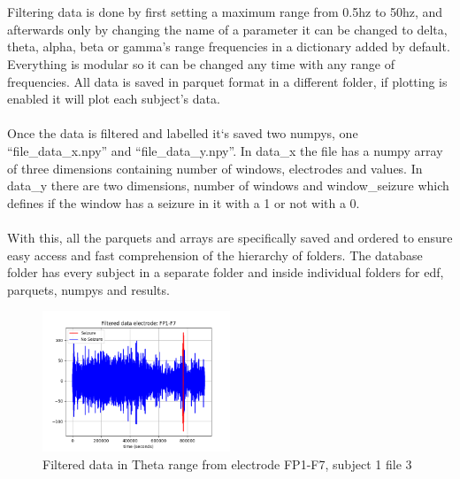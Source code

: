 \\\\
Filtering data is done by first setting a maximum range from 0.5hz to 50hz, and afterwards only by changing the name of a parameter it can be changed to delta, theta, alpha, beta or gamma’s range frequencies in a dictionary added by default. Everything is modular so it can be changed any time with any range of frequencies. All data is saved in parquet format in a different folder, if plotting is enabled it will plot each subject’s data.
\\\\
Once the data is filtered and labelled it`s saved two numpys, one “file\_data\_x.npy” and “file\_data\_y.npy”. In data\_x the file has a numpy array of three dimensions containing number of windows, electrodes and values. In data\_y there are two dimensions, number of windows and window\_seizure which defines if the window has a seizure in it with a 1 or not with a 0. 
\\\\
With this, all the parquets and arrays are specifically saved and ordered to ensure easy access and fast comprehension of the hierarchy of folders. The database folder has every subject in a separate folder and inside individual folders for edf, parquets, numpys and results.
\\
\begin{figure}[h!]
    \caption{Filtered data in Theta range from electrode FP1-F7, subject 1 file 3}
    \centering
    \includegraphics[width=0.5\textwidth]{img/seizurenoseizure.png}
\end{figure}

\leavevmode\\
